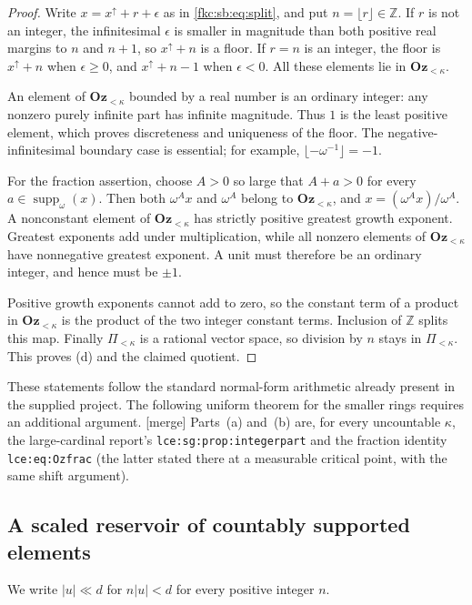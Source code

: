 \documentclass[11pt,letterpaper]{article}
\numberwithin{equation}{section}
\theoremstyle{definition}
\theoremstyle{remark}
\newcommand{\mergetag}{\textup{\textsf{\small[merge]}}}%
\newcommand{\Z}{\mathbb Z}
\newcommand{\Oz}{\mathbf{Oz}}
\newcommand{\suppw}{\operatorname{supp}_{\omega}}
\newcommand{\Ok}{\Oz_{<\kappa}}
\newcommand{\Pk}{\Pi_{<\kappa}}
\newcommand{\lbl}[1]{\nolinkurl{#1}}%
\begin{document}
\begin{proof}
Write $x=x^\uparrow+r+\epsilon$ as in \eqref{fkc:sb:eq:split}, and put $n=\lfloor r\rfloor\in\Z$. If $r$ is not an integer, the infinitesimal $\epsilon$ is smaller in magnitude than both positive real margins to $n$ and $n+1$, so $x^\uparrow+n$ is a floor. If $r=n$ is an integer, the floor is $x^\uparrow+n$ when $\epsilon\ge0$, and $x^\uparrow+n-1$ when $\epsilon<0$. All these elements lie in $\Ok$.

An element of $\Ok$ bounded by a real number is an ordinary integer: any nonzero purely infinite part has infinite magnitude. Thus $1$ is the least positive element, which proves discreteness and uniqueness of the floor. The negative-infinitesimal boundary case is essential; for example, $\lfloor-\omega^{-1}\rfloor=-1$.

For the fraction assertion, choose $A>0$ so large that $A+a>0$ for every $a\in\suppw(x)$. Then both $\omega^A x$ and $\omega^A$ belong to $\Ok$, and $x=(\omega^A x)/\omega^A$. A nonconstant element of $\Ok$ has strictly positive greatest growth exponent. Greatest exponents add under multiplication, while all nonzero elements of $\Ok$ have nonnegative greatest exponent. A unit must therefore be an ordinary integer, and hence must be $\pm1$.

Positive growth exponents cannot add to zero, so the constant term of a product in $\Ok$ is the product of the two integer constant terms. Inclusion of $\Z$ splits this map. Finally $\Pk$ is a rational vector space, so division by $n$ stays in $\Pk$. This proves (d) and the claimed quotient.
\end{proof}

These statements follow the standard normal-form arithmetic already present in the supplied project. The following uniform theorem for the smaller rings requires an additional argument. \mergetag{} Parts~(a) and~(b) are, for every uncountable $\kappa$, the large-cardinal report's \lbl{lce:sg:prop:integerpart} and the fraction identity \lbl{lce:eq:Ozfrac} (the latter stated there at a measurable critical point, with the same shift argument).

\subsection{A scaled reservoir of countably supported elements}
We write $|u|\ll d$ for $n|u|<d$ for every positive integer $n$.
\end{document}
